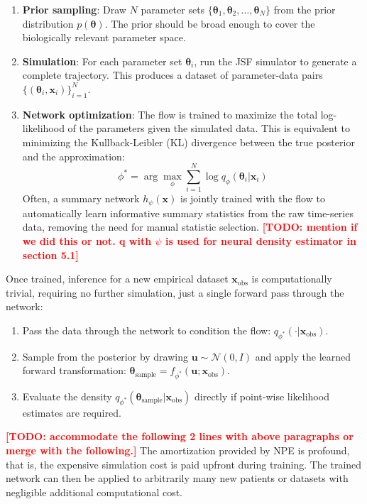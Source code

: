 \documentclass{article}
\newcommand{\todo}[1]{\textcolor{red}{\textbf{[TODO: #1]}}}
\begin{document}
\begin{enumerate}
\item \textbf{Prior sampling}: Draw $N$ parameter sets $\{\boldsymbol{\theta}_1, \boldsymbol{\theta}_2, \ldots, \boldsymbol{\theta}_N\}$ from the prior distribution $p(\boldsymbol{\theta})$. The prior should be broad enough to cover the biologically relevant parameter space.
\item \textbf{Simulation}: For each parameter set $\boldsymbol{\theta}_i$, run the JSF simulator to generate a complete trajectory. This produces a dataset of parameter-data pairs $\{(\boldsymbol{\theta}_i, \mathbf{x}_i)\}_{i=1}^N$.
\item \textbf{Network optimization}: The flow is trained to maximize the total log-likelihood of the parameters given the simulated data. This is equivalent to minimizing the Kullback-Leibler (KL) divergence between the true posterior and the approximation:
\begin{equation}
\phi^* = \arg\max_\phi \sum_{i=1}^N \log q_\phi(\boldsymbol{\theta}_i | \mathbf{x}_i)
\end{equation}
Often, a summary network $h_\psi(\mathbf{x})$ is jointly trained with the flow to automatically learn informative summary statistics from the raw time-series data, removing the need for manual statistic selection. \todo{mention if we did this or not. q with $\psi$ is used for neural density estimator in section 5.1}
\end{enumerate}
Once trained, inference for a new empirical dataset $\mathbf{x}_{\text{obs}}$ is computationally trivial, requiring no further simulation, just a single forward pass through the network:
\begin{enumerate}
\item Pass the data through the network to condition the flow: $q_{\phi^*}(\cdot | \mathbf{x}_{\text{obs}})$.
\item Sample from the posterior by drawing $\mathbf{u} \sim \mathcal{N}(0, I)$ and apply the learned forward transformation: $\boldsymbol{\theta}_{\text{sample}} = f_{\phi^*}(\mathbf{u}; \mathbf{x}_{\text{obs}})$.
\item Evaluate the density $q_{\phi^*}(\boldsymbol{\theta}_{\text{sample}} | \mathbf{x}_{\text{obs}})$ directly if point-wise likelihood estimates are required.
\end{enumerate}


\todo{accommodate the following 2 lines with above paragraphs or merge with the following.} The amortization provided by NPE is profound, that is, the expensive simulation cost is paid upfront during training. The trained network can then be applied to arbitrarily many new patients or datasets with negligible additional computational cost. 
\end{document}
